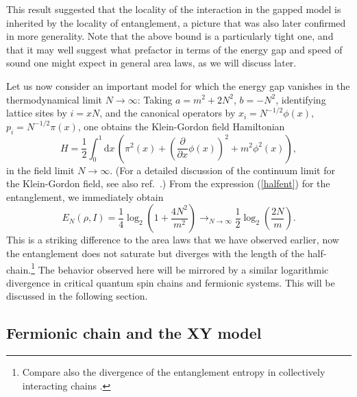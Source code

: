 \documentclass[rmp,twocolumn,floatfix,epsfig,graphics]{revtex4} %
\newcommand{\md}{\mathrm{d}}
\begin{document}
This result suggested that the locality of the interaction
in the gapped model is inherited by the locality of
entanglement, a picture that was also later confirmed
in more generality. Note that the above bound is a
particularly tight one, and that it may well suggest what 
prefactor in terms of the energy gap and speed of sound
one might expect in general area laws, as we will discuss
later.

Let us now consider an important model for which the energy 
gap vanishes in the thermodynamical limit $N\rightarrow\infty$:
Taking $a=m^2+2N^2$, $b=-N^2$, identifying lattice sites by 
$i=xN$, and the canonical operators by $x_i=N^{-1/2}\phi(x)$, 
$p_i=N^{-1/2}\pi(x)$, one obtains the Klein-Gordon field 
Hamiltonian
\begin{equation}
\label{KG}
        {H}=\frac{1}{2}\int_{0}^1\!\!\md x\,\left(\pi^2(x)
        +\left(\frac{\partial}{\partial x}\phi(x)\right)^2
        +m^2\phi^2(x)\right),
\end{equation}
in the field limit $N\rightarrow\infty$. 
(For a detailed discussion of the continuum limit for the Klein-Gordon
field, see also ref.\ \cite{Botero}.)  From the expression 
(\ref{halfent}) for the entanglement, we immediately obtain
\begin{equation}
\label{KGLogNeg}
        E_{N}(\rho,I)=\frac{1}{4}\log_2\left(1+\frac{4N^2}{m^2}\right)
        \rightarrow_{N\rightarrow\infty} \frac{1}{2}\log_2 \left(\frac{2N}{m}\right).
\end{equation}
This is a striking difference to the 
area laws that we have 
observed earlier, now the entanglement does not saturate but
diverges with the length of the half-chain.\footnote{Compare also 
the divergence of the entanglement entropy in collectively
interacting chains \cite{Fleischhauer}.} The behavior 
observed here will be mirrored by a similar logarithmic 
divergence in critical quantum spin chains and fermionic
systems. This will be discussed in the following section.

\subsection{Fermionic chain and the XY model} 
\end{document}
